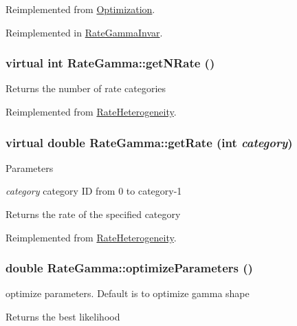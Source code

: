 Reimplemented from \hyperlink{classOptimization_a6d04cefb0969f3cac9b607aa1412eb57}{Optimization}.

Reimplemented in \hyperlink{classRateGammaInvar_a4f276d1639a79eece217b365439049c7}{RateGammaInvar}.\hypertarget{classRateGamma_a115dac63aaa8fc7ac256304506ef3307}{
\subsubsection[{getNRate}]{\setlength{\rightskip}{0pt plus 5cm}virtual int RateGamma::getNRate ()}}
\label{classRateGamma_a115dac63aaa8fc7ac256304506ef3307}
\begin{DoxyReturn}{Returns}
the number of rate categories 
\end{DoxyReturn}


Reimplemented from \hyperlink{classRateHeterogeneity_ac61808650eab5d2187f3cc9b20694f80}{RateHeterogeneity}.\hypertarget{classRateGamma_a2e459469fd578b9d5d8bb18000d9d1d9}{
\subsubsection[{getRate}]{\setlength{\rightskip}{0pt plus 5cm}virtual double RateGamma::getRate (int {\em category})}}
\label{classRateGamma_a2e459469fd578b9d5d8bb18000d9d1d9}

\begin{DoxyParams}{Parameters}
\item[{\em category}]category ID from 0 to category-\/1 \end{DoxyParams}
\begin{DoxyReturn}{Returns}
the rate of the specified category 
\end{DoxyReturn}


Reimplemented from \hyperlink{classRateHeterogeneity_a87546419c324a62d31055d564ea07f5e}{RateHeterogeneity}.\hypertarget{classRateGamma_aadba870d743295ef057f9c78ac7fdd06}{
\subsubsection[{optimizeParameters}]{\setlength{\rightskip}{0pt plus 5cm}double RateGamma::optimizeParameters ()}}
\label{classRateGamma_aadba870d743295ef057f9c78ac7fdd06}
optimize parameters. Default is to optimize gamma shape \begin{DoxyReturn}{Returns}
the best likelihood 
\end{DoxyReturn}


